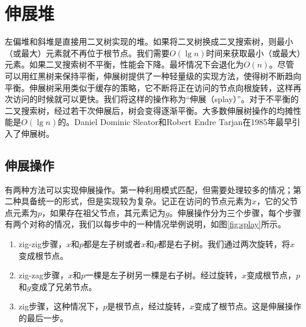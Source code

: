 \documentclass[b5paper]{ctexart}
\begin{document}
\section{伸展堆}
\label{splayheap}

左偏堆和斜堆是直接用二叉树实现的堆。如果将二叉树换成二叉搜索树，则最小（或最大）元素就不再位于根节点。我们需要$O(\lg n)$时间来获取最小（或最大）元素。如果二叉搜索树不平衡，性能会下降。最坏情况下会退化为$O(n)$。尽管可以用红黑树来保持平衡，伸展树提供了一种轻量级的实现方法，使得树不断趋向平衡。伸展树采用类似于缓存的策略，它不断将正在访问的节点向根旋转，这样再次访问的时候就可以更快。我们将这样的操作称为“伸展（splay）”。对于不平衡的二叉搜索树，经过若干次伸展后，树会变得逐渐平衡。大多数伸展树操作的均摊性能是$O(\lg n)$的。Daniel Dominic Sleator和Robert Endre Tarjan在1985年最早引入了伸展树\cite{wiki-splay-tree}\cite{self-adjusting-trees}。

\subsection{伸展操作}

有两种方法可以实现伸展操作。第一种利用模式匹配，但需要处理较多的情况；第二种具备统一的形式，但是实现较为复杂。记正在访问的节点元素为$x$，它的父节点元素为$p$，如果存在祖父节点，其元素记为$g$。伸展操作分为三个步骤，每个步骤有两个对称的情况，我们以每步中的一种情况举例说明，如图\ref{fig:splay}所示。

\begin{enumerate}
\item zig-zig步骤，$x$和$p$都是左子树或者$x$和$p$都是右子树。我们通过两次旋转，将$x$变成根节点。

\item zig-zag步骤，$x$和$p$一棵是左子树另一棵是右子树。经过旋转，$x$变成根节点，$p$和$g$变成了兄弟节点。

\item zig步骤，这种情况下，$p$是根节点，经过旋转，$x$变成了根节点。这是伸展操作的最后一步。
\end{enumerate}
\end{document}
